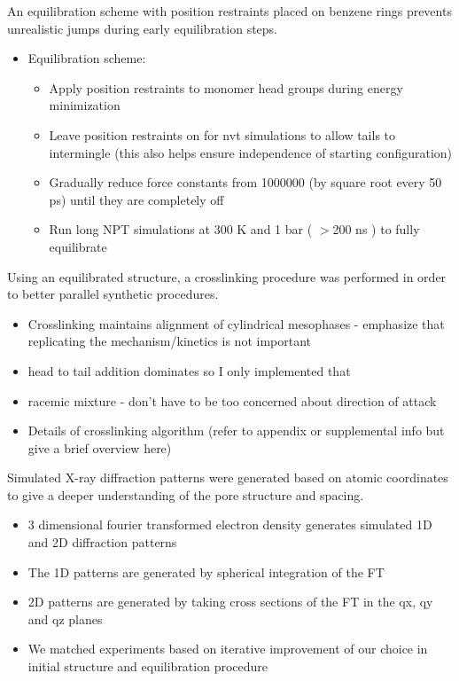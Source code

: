 \documentclass{article}
\begin{document}
	An equilibration scheme with position restraints placed on benzene rings prevents unrealistic jumps during early equilibration steps.
	\begin{itemize}
		\item Equilibration scheme:
		\begin{itemize}
			\item Apply position restraints to monomer head groups during energy minimization 
			\item Leave position restraints on for nvt simulations to allow tails to intermingle (this also helps ensure independence of starting configuration)
			\item Gradually reduce force constants from 1000000 (by square root every 50 ps) until they are completely off
			\item Run long NPT simulations at 300 K and 1 bar ( $>$200 ns ) to fully equilibrate 
		\end{itemize}
	\end{itemize}
	
	Using an equilibrated structure, a crosslinking procedure was performed in order to better parallel synthetic procedures. 
	\begin{itemize}
		\item Crosslinking maintains alignment of cylindrical mesophases - emphasize that replicating the mechanism/kinetics is not important 
		\item head to tail addition dominates so I only implemented that
		\item racemic mixture - don't have to be too concerned about direction of attack 
		\item Details of crosslinking algorithm (refer to appendix or supplemental info but give a brief overview here)
	\end{itemize}  
	
	Simulated X-ray diffraction patterns were generated based on atomic coordinates to give a deeper understanding of the pore structure and spacing. 
        \begin{itemize}
               \item 3 dimensional fourier transformed electron density generates simulated 1D and 2D diffraction patterns
               \item The 1D patterns are generated by spherical integration of the FT
               \item 2D patterns are generated by taking cross sections of the FT in the qx, qy and qz planes
               \item We matched experiments based on iterative improvement of our choice in initial structure and equilibration procedure
        \end{itemize}
\end{document}
